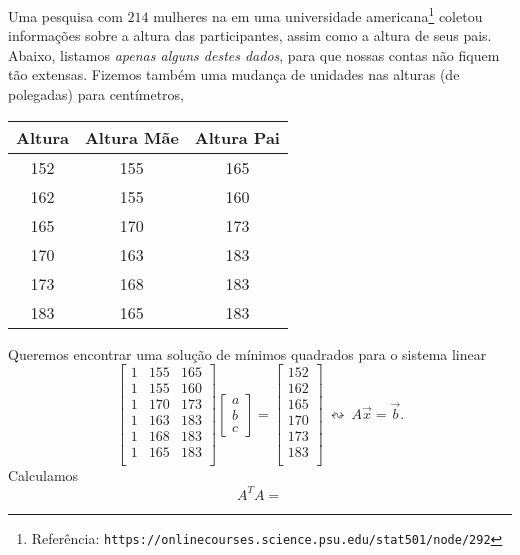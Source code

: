 \documentclass[../livro.tex]{subfiles}  %
\begin{document}
\begin{example}
  Uma pesquisa com $214$ mulheres na em uma universidade americana\footnote{Referência: \verb"https://onlinecourses.science.psu.edu/stat501/node/292"} coletou informações sobre a altura das participantes, assim como a altura de seus pais. Abaixo, listamos \textit{apenas alguns destes dados}, para que nossas contas não fiquem tão extensas. Fizemos também uma mudança de unidades nas alturas (de polegadas) para centímetros,
  \begin{center}
    \begin{tabular}{|c|c|c|}
      \hline
      Altura & Altura Mãe & Altura Pai \\ \hline
      152 & 155 & 165 \\
      162 & 155 & 160 \\
      165 & 170 & 173 \\
      170 & 163 & 183 \\
      173 & 168 & 183 \\
      183 & 165 & 183 \\
      \hline
    \end{tabular}
  \end{center} Queremos encontrar uma solução de mínimos quadrados para o sistema linear
  \[
  \begin{bmatrix}
    1 & 155 & 165 \\
    1 & 155 & 160 \\
    1 & 170 & 173 \\
    1 & 163 & 183 \\
    1 & 168 & 183 \\
    1 & 165 & 183 \\
  \end{bmatrix}
  \begin{bmatrix}
    a \\ b \\ c
  \end{bmatrix} =
  \begin{bmatrix}
    152  \\
    162  \\
    165  \\
    170  \\
    173  \\
    183  \\
  \end{bmatrix} \ \leftrightsquigarrow \ A \vec{x} = \vec{b}.
  \] Calculamos
  \[
  A^TA =
\]
\end{example}
\end{document}
